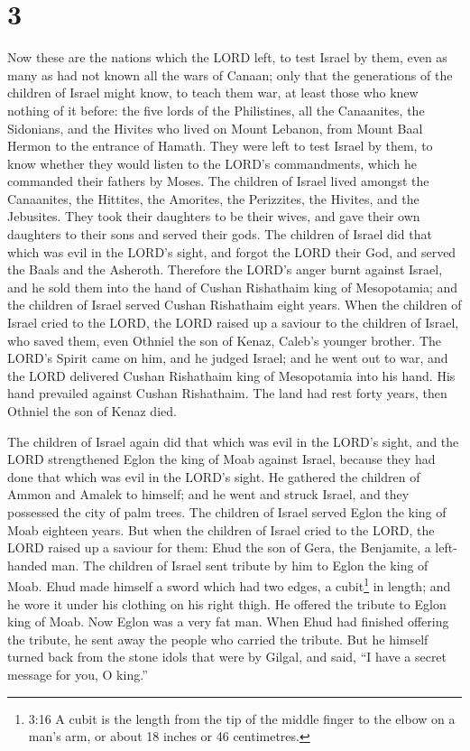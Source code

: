 \hypertarget{section-2}{%
\section{3}\label{section-2}}

 Now these are the nations which the LORD left, to test
Israel by them, even as many as had not known all the wars of Canaan;
 only that the generations of the children of Israel might
know, to teach them war, at least those who knew nothing of it before:
 the five lords of the Philistines, all the Canaanites, the
Sidonians, and the Hivites who lived on Mount Lebanon, from Mount Baal
Hermon to the entrance of Hamath.  They were left to test
Israel by them, to know whether they would listen to the LORD's
commandments, which he commanded their fathers by Moses. 
The children of Israel lived amongst the Canaanites, the Hittites, the
Amorites, the Perizzites, the Hivites, and the Jebusites. 
They took their daughters to be their wives, and gave their own
daughters to their sons and served their gods.  The children
of Israel did that which was evil in the LORD's sight, and forgot the
LORD their God, and served the Baals and the Asheroth. 
Therefore the LORD's anger burnt against Israel, and he sold them into
the hand of Cushan Rishathaim king of Mesopotamia; and the children of
Israel served Cushan Rishathaim eight years.  When the
children of Israel cried to the LORD, the LORD raised up a saviour to
the children of Israel, who saved them, even Othniel the son of Kenaz,
Caleb's younger brother.  The LORD's Spirit came on him,
and he judged Israel; and he went out to war, and the LORD delivered
Cushan Rishathaim king of Mesopotamia into his hand. His hand prevailed
against Cushan Rishathaim.  The land had rest forty years,
then Othniel the son of Kenaz died.

 The children of Israel again did that which was evil in
the LORD's sight, and the LORD strengthened Eglon the king of Moab
against Israel, because they had done that which was evil in the LORD's
sight.  He gathered the children of Ammon and Amalek to
himself; and he went and struck Israel, and they possessed the city of
palm trees.  The children of Israel served Eglon the king
of Moab eighteen years.  But when the children of Israel
cried to the LORD, the LORD raised up a saviour for them: Ehud the son
of Gera, the Benjamite, a left-handed man. The children of Israel sent
tribute by him to Eglon the king of Moab.  Ehud made
himself a sword which had two edges, a cubit\footnote{3:16 A cubit is
  the length from the tip of the middle finger to the elbow on a man's
  arm, or about 18 inches or 46 centimetres.} in length; and he wore it
under his clothing on his right thigh.  He offered the
tribute to Eglon king of Moab. Now Eglon was a very fat man.
 When Ehud had finished offering the tribute, he sent away
the people who carried the tribute.  But he himself turned
back from the stone idols that were by Gilgal, and said, ``I have a
secret message for you, O king.''

